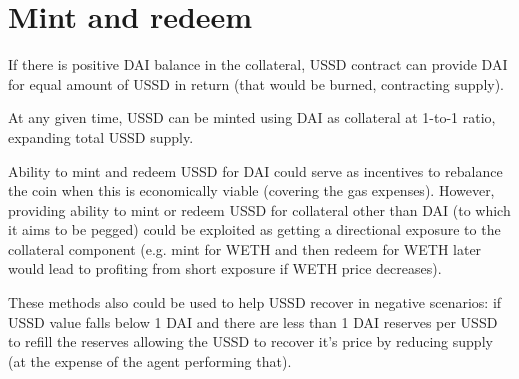 \section{Mint and redeem}

If there is positive DAI balance in the collateral, USSD contract can provide DAI for equal 
amount of USSD in return (that would be burned, contracting supply).

At any given time, USSD can be minted using DAI as collateral at 1-to-1 ratio, expanding 
total USSD supply.

Ability to mint and redeem USSD for DAI could serve as incentives to rebalance the coin 
when this is economically viable (covering the gas expenses). However, providing ability 
to mint or redeem USSD for collateral other than DAI (to which it aims to be pegged) 
could be exploited as getting a directional exposure to the collateral component 
(e.g. mint for WETH and then redeem for WETH later would lead to profiting from short 
exposure if WETH price decreases).

These methods also could be used to help USSD recover in negative scenarios: if USSD value 
falls below 1 DAI and there are less than 1 DAI reserves per USSD to refill the reserves 
allowing the USSD to recover it's price by reducing supply (at the expense of the agent 
performing that).

